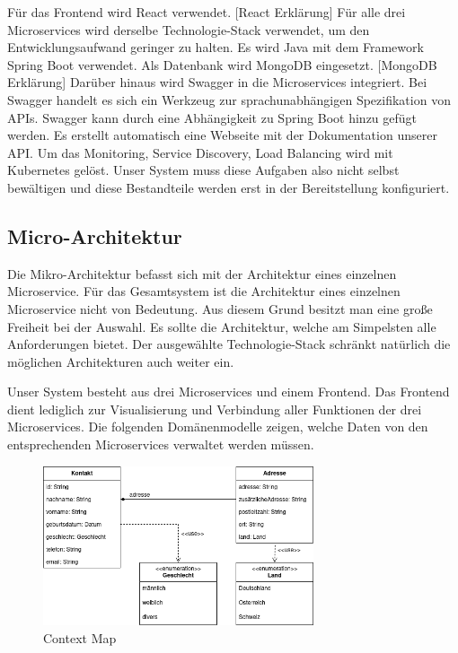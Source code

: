 Für das Frontend wird React verwendet. [React Erklärung]
Für alle drei Microservices wird derselbe Technologie-Stack verwendet, um den Entwicklungsaufwand geringer zu halten. Es wird Java mit dem Framework Spring Boot verwendet. Als Datenbank wird MongoDB eingesetzt. [MongoDB Erklärung] Darüber hinaus wird Swagger in die Microservices integriert. Bei Swagger handelt es sich ein Werkzeug zur sprachunabhängigen Spezifikation von APIs. Swagger kann durch eine Abhängigkeit zu Spring Boot hinzu gefügt werden. Es erstellt automatisch eine Webseite mit der Dokumentation unserer API. Um das Monitoring, Service Discovery, Load Balancing wird mit Kubernetes gelöst. Unser System muss diese Aufgaben also nicht selbst bewältigen und diese Bestandteile werden erst in der Bereitstellung konfiguriert.

\subsection{Micro-Architektur}

Die Mikro-Architektur befasst sich mit der Architektur eines einzelnen Microservice. Für das Gesamtsystem ist die Architektur eines einzelnen Microservice nicht von Bedeutung. Aus diesem Grund besitzt man eine große Freiheit bei der Auswahl. Es sollte die Architektur, welche am Simpelsten alle Anforderungen bietet. Der ausgewählte Technologie-Stack schränkt natürlich die möglichen Architekturen auch weiter ein.

Unser System besteht aus drei Microservices und einem Frontend. Das Frontend dient lediglich zur Visualisierung und Verbindung aller Funktionen der drei Microservices. Die folgenden Domänenmodelle zeigen, welche Daten von den entsprechenden Microservices verwaltet werden müssen.

\begin{figure}[H] 
    \centering
    \includegraphics[width=0.71\textwidth]{figures/KontaktUMLDiagram.png}
    \caption{Context Map}
    \label{fig:CRMENTWURF}
\end{figure} 

